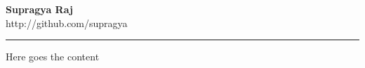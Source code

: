 \documentclass{article}
\begin{document}
\begin{center}
\textbf{Supragya Raj}
\\
http://github.com/supragya
\end{center}
\hrule

Here goes the content
\end{document}
